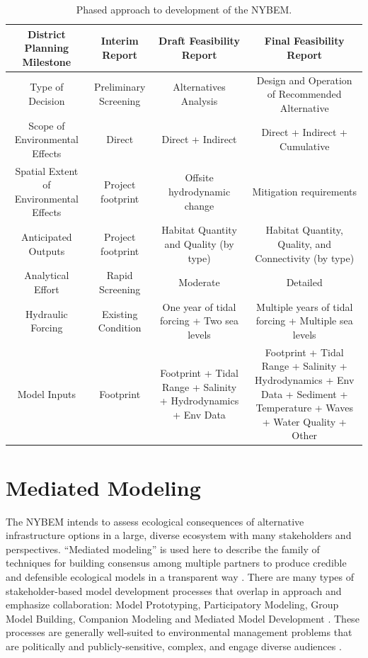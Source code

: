 \documentclass[
]{book}
\begin{document}
\begin{table}

\caption{\label{tab:unnamed-chunk-4}Phased approach to development of the NYBEM.}
\centering
\begin{tabular}[t]{c|c|c|c}
\hline
District Planning Milestone & Interim Report & Draft Feasibility Report & Final Feasibility Report\\
\hline
Type of Decision & Preliminary Screening & Alternatives Analysis & Design and Operation of Recommended Alternative\\
\hline
Scope of Environmental Effects & Direct & Direct + Indirect & Direct + Indirect + Cumulative\\
\hline
Spatial Extent of Environmental Effects & Project footprint & Offsite hydrodynamic change & Mitigation requirements\\
\hline
Anticipated Outputs & Project footprint & Habitat Quantity and Quality (by type) & Habitat Quantity, Quality, and Connectivity (by type)\\
\hline
Analytical Effort & Rapid Screening & Moderate & Detailed\\
\hline
Hydraulic Forcing & Existing Condition & One year of tidal forcing + Two sea levels & Multiple years of tidal forcing + Multiple sea levels\\
\hline
Model Inputs & Footprint & Footprint + Tidal Range + Salinity + Hydrodynamics + Env Data & Footprint + Tidal Range + Salinity + Hydrodynamics + Env Data + Sediment + Temperature + Waves + Water Quality + Other\\
\hline
\end{tabular}
\end{table}

\hypertarget{mediated-modeling}{%
\section{Mediated Modeling}\label{mediated-modeling}}

The NYBEM intends to assess ecological consequences of alternative infrastructure options in a large, diverse ecosystem with many stakeholders and perspectives. ``Mediated modeling'' is used here to describe the family of techniques for building consensus among multiple partners to produce credible and defensible ecological models in a transparent way \citep{van_den_belt_mediated_2006}. There are many types of stakeholder-based model development processes that overlap in approach and emphasize collaboration: Model Prototyping, Participatory Modeling, Group Model Building, Companion Modeling and Mediated Model Development \citetext{\citealp[See reviews by][]{voinov_modelling_2010}; \citealp{gray_environmental_2017}; \citealp[and][]{hall_mediated_2019}}. These processes are generally well-suited to environmental management problems that are politically and publicly-sensitive, complex, and engage diverse audiences \citep{van_den_belt_mediated_2006}.
\end{document}

